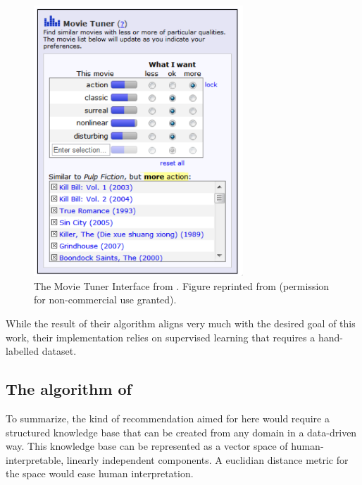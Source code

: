 \begin{figure}[H]
    \centering
    \includegraphics[width=0.7\textwidth]{graphics/stolenfigures/movietuner.png}
    \caption[The Movie Tuner Interface from \cite{VISR12}]{
        The Movie Tuner Interface from \textcite{VISR12}. Figure reprinted from \cite{Vig2010} (permission for non-commercial use granted). 
        \label{fig:movietuner}}
\end{figure}

While the result of their algorithm aligns very much with the desired goal of this work, their implementation relies on supervised learning that requires a hand-labelled dataset.

\subsection{The algorithm of \textcite{Derrac2015}}


To summarize, the kind of recommendation aimed for here would require a structured knowledge base that can be created from any domain in a data-driven way. This knowledge base can be represented as a vector space of human-interpretable, linearly independent components. A euclidian distance metric for the space would ease human interpretation. 


